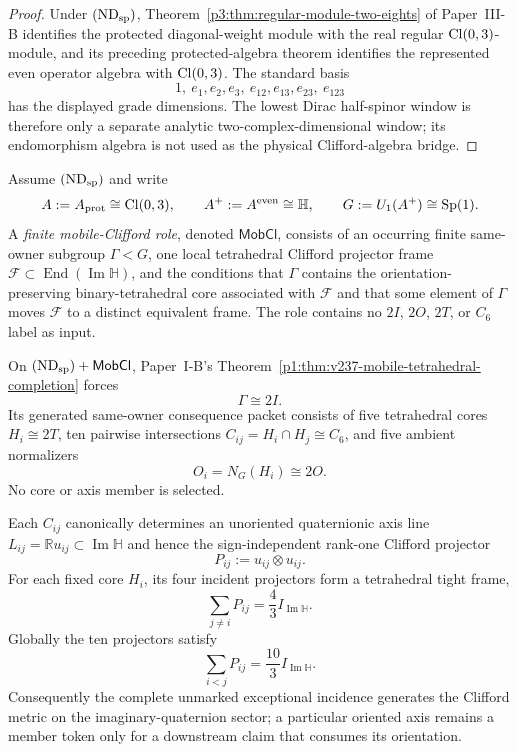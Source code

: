 \documentclass[12pt,a4paper]{article}
\begin{document}
\begin{proof}
Under \((\mathrm{ND}_{\rm sp})\), Theorem~\ref{p3:thm:regular-module-two-eights}
of Paper~III-B identifies the protected diagonal-weight module with the real
regular \(\operatorname{Cl}(0,3)\)-module, and its preceding protected-algebra theorem
identifies the represented even operator algebra with \(\operatorname{Cl}(0,3)\).  The
standard basis
\[
1,\ e_1,e_2,e_3,\ e_{12},e_{13},e_{23},\ e_{123}
\]
has the displayed grade dimensions.  The lowest Dirac half-spinor window is
therefore only a separate analytic two-complex-dimensional window; its
endomorphism algebra is not used as the physical Clifford-algebra bridge.
\end{proof}



\begin{definition}
\label{p3c:def:v237-mobile-clifford-role}
Assume \((\mathrm{ND}_{\rm sp})\) and write
\[
 A:=A_{\rm prot}\cong\operatorname{Cl}(0,3),\qquad
 A^+:=A^{\rm even}\cong\mathbb H,\qquad
 G:=U_1(A^+)\cong\operatorname{Sp}(1).
\]
A \emph{finite mobile-Clifford role}, denoted \(\mathsf{MobCl}\), consists of
an occurring finite same-owner subgroup \(\Gamma<G\), one local tetrahedral
Clifford projector frame \(\mathcal F\subset\operatorname{End}(\operatorname{Im}\mathbb H)\),
and the conditions that \(\Gamma\) contains the orientation-preserving
binary-tetrahedral core associated with \(\mathcal F\) and that some element
of \(\Gamma\) moves \(\mathcal F\) to a distinct equivalent frame.  The role
contains no \(2I\), \(2O\), \(2T\), or \(C_6\) label as input.
\end{definition}

\begin{theorem}
\label{p3c:thm:v237-generated-clifford-exceptional-resolution}
On \((\mathrm{ND}_{\rm sp})+\mathsf{MobCl}\), Paper~I-B's
Theorem~\ref{p1:thm:v237-mobile-tetrahedral-completion} forces
\[
 \boxed{\Gamma\cong2I.}
\]
Its generated same-owner consequence packet consists of five tetrahedral cores
\(H_i\cong2T\), ten pairwise intersections
\(C_{ij}=H_i\cap H_j\cong C_6\), and five ambient normalizers
\[
 O_i=N_G(H_i)\cong2O.
\]
No core or axis member is selected.

Each \(C_{ij}\) canonically determines an unoriented quaternionic axis line
\(L_{ij}=\mathbb Ru_{ij}\subset\operatorname{Im}\mathbb H\) and hence the
sign-independent rank-one Clifford projector
\[
 P_{ij}:=u_{ij}\otimes u_{ij}.
\]
For each fixed core \(H_i\), its four incident projectors form a tetrahedral
tight frame,
\[
 \boxed{\sum_{j\ne i}P_{ij}=\frac43 I_{\operatorname{Im}\mathbb H}.}
\]
Globally the ten projectors satisfy
\[
 \boxed{\sum_{i<j}P_{ij}=\frac{10}{3}I_{\operatorname{Im}\mathbb H}.}
\]
Consequently the complete unmarked exceptional incidence generates the
Clifford metric on the imaginary-quaternion sector; a particular oriented
axis remains a member token only for a downstream claim that consumes its
orientation.
\end{theorem}
\end{document}
